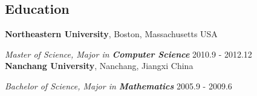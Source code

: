 \documentclass[margin,line]{res}
\begin{document}
\begin{resume}
\section{\sc Education}
{\bf Northeastern University}, Boston, Massachusetts USA

\vspace{-.3cm}
{\em Master of Science, Major in {\bf Computer Science}} \hfill {2010.9 - 2012.12}\\

{\bf Nanchang University}, Nanchang, Jiangxi China

\vspace{-.3cm}
{\em Bachelor of Science, Major in {\bf Mathematics}} \hfill {2005.9 - 2009.6}\\


\end{resume}
\end{document}
